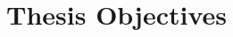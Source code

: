 \chapter{Thesis Objectives}
\label{chap:research_questions}
\graphicspath{{Research_Questions/Images/}}
